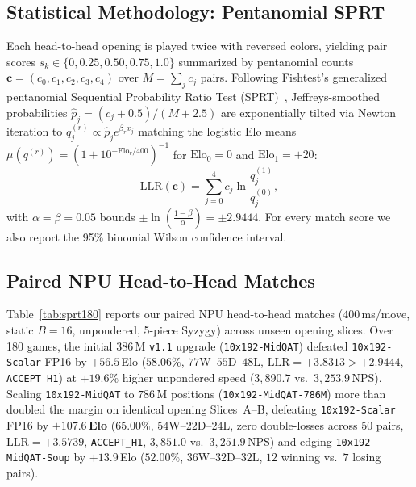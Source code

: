 \documentclass[10pt,twocolumn]{article}
\begin{document}
\subsection{Statistical Methodology: Pentanomial SPRT}
Each head-to-head opening is played twice with reversed colors, yielding pair scores $s_k \in \{0, 0.25, 0.50, 0.75, 1.0\}$ summarized by pentanomial counts $\mathbf{c} = (c_0, c_1, c_2, c_3, c_4)$ over $M = \sum_j c_j$ pairs. Following Fishtest's generalized pentanomial Sequential Probability Ratio Test (SPRT)~\cite{wald1945sprt,stockfish2025}, Jeffreys-smoothed probabilities $\hat{p}_j = (c_j + 0.5)/(M + 2.5)$ are exponentially tilted via Newton iteration to $q^{(r)}_j \propto \hat{p}_j e^{\beta_r x_j}$ matching the logistic Elo means $\mu(q^{(r)}) = (1 + 10^{-\mathrm{Elo}_r/400})^{-1}$ for $\mathrm{Elo}_0 = 0$ and $\mathrm{Elo}_1 = +20$:
\begin{equation}
  \mathrm{LLR}(\mathbf{c}) = \sum_{j=0}^{4} c_j \ln\!\frac{q^{(1)}_j}{q^{(0)}_j},
  \label{eq:sprt}
\end{equation}
with $\alpha = \beta = 0.05$ bounds $\pm \ln\!\left(\frac{1-\beta}{\alpha}\right) = \pm 2.9444$. For every match score we also report the 95\% binomial Wilson confidence interval.

\subsection{Paired NPU Head-to-Head Matches}
Table~\ref{tab:sprt180} reports our paired NPU head-to-head matches ($400$\,ms/move, static $B=16$, unpondered, 5-piece Syzygy) across unseen opening slices. Over 180 games, the initial $386$\,M \texttt{v1.1} upgrade (\texttt{10x192-MidQAT}) defeated \texttt{10x192-Scalar} FP16 by $+56.5$\,Elo ($58.06\%$, $77\text{W}\text{--}55\text{D}\text{--}48\text{L}$, $\mathrm{LLR} = +3.8313 > +2.9444$, \texttt{ACCEPT\_H1}) at $+19.6\%$ higher unpondered speed ($3{,}890.7$ vs.\ $3{,}253.9$\,NPS). Scaling \texttt{10x192-MidQAT} to $786$\,M positions (\texttt{10x192-MidQAT-786M}) more than doubled the margin on identical opening Slices~A--B, defeating \texttt{10x192-Scalar} FP16 by \textbf{$+107.6$\,Elo} ($65.00\%$, $54\text{W}\text{--}22\text{D}\text{--}24\text{L}$, zero double-losses across 50 pairs, $\mathrm{LLR} = +3.5739$, \texttt{ACCEPT\_H1}, $3{,}851.0$ vs.\ $3{,}251.9$\,NPS) and edging \texttt{10x192-MidQAT-Soup} by $+13.9$\,Elo ($52.00\%$, $36\text{W}\text{--}32\text{D}\text{--}32\text{L}$, $12$ winning vs.\ $7$ losing pairs).
\end{document}
